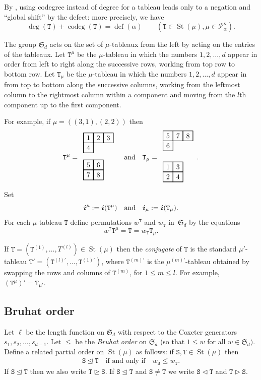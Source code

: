 \documentclass[twoside,11pt,reqno]{amsart}
\numberwithin{equation}{section}
\theoremstyle{definition}  %
\DeclareMathOperator\ldom {\triangleleft}
\DeclareMathOperator\ledom{\trianglelefteq}
\DeclareMathOperator\gdom {\triangleright}
\DeclareMathOperator\gedom{\trianglerighteq}
\def\bi{\text{\boldmath$i$}}
\newcommand{\St}{\operatorname{St}}
\newcommand{\Stab}{\operatorname{Stab}}
\newcommand{\0}{{\bar 0}}
\newcommand{\1}{{\bar 1}}
\newcommand{\al}{\alpha}
\def\Si{\mathfrak{S}}
\newcommand\Par[1][]{{\mathscr P}^{\kappa#1}}
\def\T{{\mathtt T}}
\def\Stab{{\mathtt S}}
\def\defect{\operatorname{def}}
\def\codeg{\operatorname{codeg}}
\newcommand\Tableau[2][\relax]{
  \begin{tikzpicture}[scale=0.5,draw/.append style={thick,black}]
    \ifx\relax#1\relax%
    \else %
      \foreach\box in {#1} { \filldraw[blue!30]\box+(-.5,-.5)rectangle++(.5,.5); }
    \fi
    \newcount\row\newcount\col
    \row=0
    \foreach \Row in {#2} {
       \col=1
       \foreach\k in \Row {
          \draw(\the\col,\the\row)+(-.5,-.5)rectangle++(.5,.5);
          \draw(\the\col,\the\row)node{\k};
          \global\advance\col by 1
       }
       \global\advance\row by -1
    }
  \end{tikzpicture}
}
\begin{document}
By  \cite[Lemma 3.12]{BKW}, using codegree instead of degree for a tableau leads only to a negation and  ``global shift'' by the defect: more precisely, we have
\begin{equation}\label{EDegCodeg}
\deg(\T)+\codeg(\T)=\defect(\al)\qquad(\T\in\St(\mu), \mu\in\Par_\al).
\end{equation}

The group $\Si_d$ acts on the set of $\mu$-tableaux from the left by acting on the entries of the tableaux.
Let $\T^\mu$ be the $\mu$-tableau in which the numbers $1,2,\dots,d$ appear in order from left to right along the successive rows,
working from top row to bottom row. Let $\T_\mu$ be the $\mu$-tableau in which the numbers $1,2,\dots,d$ appear in
from top to bottom along the successive columns, working from the leftmost column to the rightmost column within a component
and moving from the $l$th component up to the first component. 

For example, if $\mu=((3,1),(2,2))$ then
$$
\T^\mu=\begin{array}{l} \Tableau{{1,2,3},{4}}\\[2mm]\Tableau{{5,6},{7,8}}\end{array}
\quad\text{and}\quad
\T_\mu=\begin{array}{l} \Tableau{{5,7,8},{6}}\\[4mm]\Tableau{{1,3},{2,4}}\end{array}.
$$
Set 
\begin{equation}\label{EBIMu}
\bi^\mu:=\bi(\T^\mu) \quad\text{and}\quad
\bi_\mu:=\bi(\T_\mu).
\end{equation} 
For each $\mu$-tableau $\T$ define permutations $w^\T$ and $w_\T$ in~$\Si_d$ by the equations
\begin{equation}\label{EWT}
w^\T  \T^\mu=\T=w_\T \T_\mu.
\end{equation}

If
$\T=(\T^{(1)},\dots,T^{(l)})\in\St(\mu)$ then the {\em conjugate} of $\T$ is the standard $\mu'$-tableau
$\T'=(\T^{(l)'},\dots,\T^{(1)'})$, where $\T^{(m)'}$ is the $\mu^{(m)'}$-tableau obtained by swapping the rows
and columns of $\T^{(m)}$, for $1\le m\le l$. For example, $(\T^\mu)'=\T_{\mu'}$. 


\subsection{Bruhat order}
Let $\ell$ be the length function on $\Si_d$ with respect to the Coxeter generators
$s_1,s_2,\dots,s_{d-1}$. Let $\le$ be the {\em Bruhat order} on $\Si_d$ (so that $1\le w$ for all
$w\in\Si_d)$. Define a related
partial order on $\St(\mu)$ as follows: if $\Stab,\T\in\St(\mu)$ then
\begin{align}\label{EBruhat}
\Stab\ledom\T\quad\text{if and only if}\quad w_\Stab\le w_\T.
\end{align}
If $\Stab\ledom\T$ then we also write $\T\gedom\Stab$. If $\Stab\ledom\T$ and $\Stab\ne\T$ we write $\Stab\ldom\T$ and $\T\gdom\Stab$.
\end{document}
